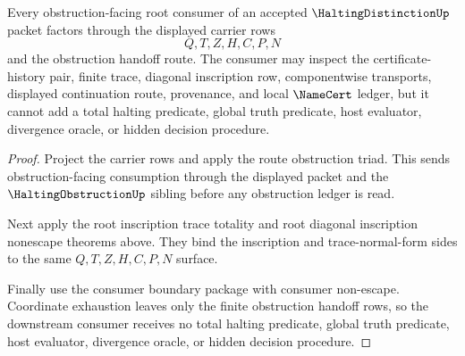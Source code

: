 \begin{theorem}
\label{thm:halting-distinction-root-consumer-obstruction-exhaustion}
Every obstruction-facing root consumer of an accepted $\HaltingDistinctionUp$ packet factors through the displayed carrier rows
$$
Q,T,Z,H,C,P,N
$$
and the obstruction handoff route. The consumer may inspect the certificate-history pair, finite trace, diagonal inscription row, componentwise transports, displayed continuation route, provenance, and local $\NameCert$ ledger, but it cannot add a total halting predicate, global truth predicate, host evaluator, divergence oracle, or hidden decision procedure.
\end{theorem}
\begin{proof}
Project the carrier rows and apply the route obstruction triad. This sends obstruction-facing consumption through the displayed packet and the $\HaltingObstructionUp$ sibling before any obstruction ledger is read.

Next apply the root inscription trace totality and root diagonal inscription nonescape theorems above. They bind the inscription and trace-normal-form sides to the same $Q,T,Z,H,C,P,N$ surface.

Finally use the consumer boundary package with consumer non-escape. Coordinate exhaustion leaves only the finite obstruction handoff rows, so the downstream consumer receives no total halting predicate, global truth predicate, host evaluator, divergence oracle, or hidden decision procedure.
\end{proof}

